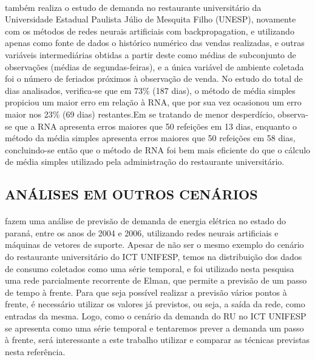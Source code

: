 \documentclass[	12pt, Times, openright, twoside, a4paper, english, brazil]{abntex2}
\begin{document}
        \paragraph*{} \cite{Rocha2011} também realiza o estudo de demanda no restaurante universitário da Universidade Estadual Paulista Júlio de Mesquita Filho (UNESP), novamente com os métodos de redes neurais artificiais com backpropagation, e utilizando apenas como fonte de dados o histórico numérico das vendas realizadas, e outras variáveis intermediárias obtidas a partir deste como médias de subconjunto de observações (médias de segundas-feiras), e a única variável de ambiente coletada foi o número de feriados próximos à observação de venda. No estudo do total de dias analisados, verifica-se que em 73\% (187 dias), o método de média simples propiciou um maior erro em relação à RNA, que por sua vez ocasionou um erro maior nos 23\% (69 dias) restantes.Em se tratando de menor desperdício, observa-se que a RNA apresenta erros maiores que 50 refeições em 13 dias, enquanto o método da média simples apresenta erros maiores que 50 refeições em 58 dias, concluindo-se então que o método de RNA foi bem mais eficiente do que o cálculo de média simples utilizado pela administração do restaurante universitário.
      
      \subsection{ANÁLISES EM OUTROS CENÁRIOS} 
        \paragraph*{} \cite{RUAS2012} fazem uma análise de previsão de demanda de energia elétrica no estado do paraná, entre os anos de 2004 e 2006, utilizando redes neurais artificiais e máquinas de vetores de suporte. Apesar de não ser o mesmo exemplo do cenário do restaurante universitário do ICT UNIFESP, temos na distribuição dos dados de consumo coletados como uma série temporal, e foi utilizado nesta pesquisa uma rede parcialmente recorrente de Elman, que permite a previsão de um passo de tempo à frente. Para que seja possível realizar a previsão vários pontos à frente, é necessário utilizar os valores já previstos, ou seja, a saída da rede, como entradas da mesma. Logo, como o cenário da demanda do RU no ICT UNIFESP se apresenta como uma série temporal e tentaremos prever a demanda um passo à frente, será interessante a este trabalho utilizar e comparar as técnicas previstas nesta referência.
        
\end{document}
